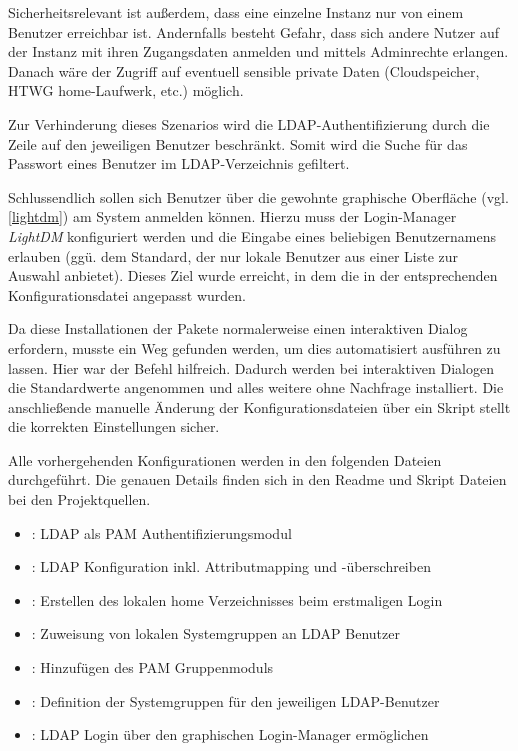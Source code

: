 Sicherheitsrelevant ist außerdem, dass eine einzelne Instanz nur von einem Benutzer erreichbar ist. 
Andernfalls besteht Gefahr, dass sich andere Nutzer auf der Instanz mit ihren Zugangsdaten anmelden und mittels  Adminrechte erlangen.
Danach wäre der Zugriff auf eventuell sensible private Daten (Cloudspeicher, HTWG home-Laufwerk, etc.) möglich.

Zur Verhinderung dieses Szenarios wird die LDAP-Authentifizierung durch die Zeile   auf den jeweiligen Benutzer beschränkt.
Somit wird die Suche für das Passwort eines Benutzer im LDAP-Verzeichnis gefiltert.

Schlussendlich sollen sich Benutzer über die gewohnte graphische Oberfläche (vgl. \autoref{lightdm}) am System anmelden können.
Hierzu muss der Login-Manager \emph{LightDM} konfiguriert werden und die Eingabe eines beliebigen Benutzernamens erlauben (ggü. dem Standard, der nur lokale Benutzer aus einer Liste zur Auswahl anbietet).
Dieses Ziel wurde erreicht, in dem die  in der entsprechenden Konfigurationsdatei angepasst wurden.

Da diese Installationen der Pakete normalerweise einen interaktiven Dialog erfordern, musste ein Weg gefunden werden, um dies automatisiert ausführen zu lassen.
Hier war der Befehl  hilfreich. 
Dadurch werden bei interaktiven Dialogen die Standardwerte angenommen und alles weitere ohne Nachfrage installiert. 
Die anschließende manuelle Änderung der Konfigurationsdateien über ein Skript stellt die korrekten Einstellungen sicher.

Alle vorhergehenden Konfigurationen werden in den folgenden Dateien durchgeführt. 
Die genauen Details finden sich in den Readme und Skript Dateien bei den Projektquellen.

\begin{itemize}
\item {}: LDAP als PAM Authentifizierungsmodul
\item {}: LDAP Konfiguration inkl. Attributmapping und -überschreiben
\item {}: Erstellen des lokalen home Verzeichnisses beim erstmaligen Login
\item {}: Zuweisung von lokalen Systemgruppen an LDAP Benutzer
\item {}: Hinzufügen des PAM Gruppenmoduls
\item {}: Definition der Systemgruppen für den jeweiligen LDAP-Benutzer
\item {}: LDAP Login über den graphischen Login-Manager ermöglichen
\end{itemize}

